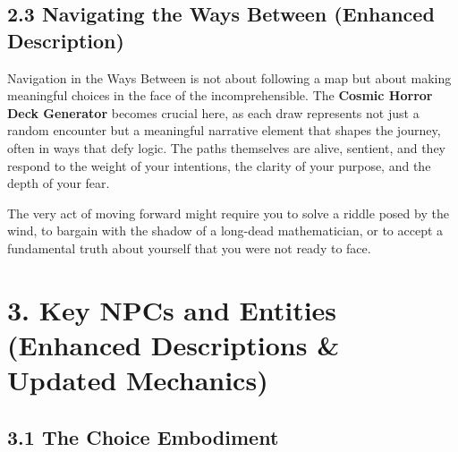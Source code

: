 \documentclass[11pt]{article}
\begin{document}
\subsection*{2.3 Navigating the Ways Between (Enhanced Description)}

Navigation in the Ways Between is not about following a map but about making meaningful choices in the face of the incomprehensible. The \textbf{Cosmic Horror Deck Generator} becomes crucial here, as each draw represents not just a random encounter but a meaningful narrative element that shapes the journey, often in ways that defy logic. The paths themselves are alive, sentient, and they respond to the weight of your intentions, the clarity of your purpose, and the depth of your fear.

The very act of moving forward might require you to solve a riddle posed by the wind, to bargain with the shadow of a long-dead mathematician, or to accept a fundamental truth about yourself that you were not ready to face.

\clearpage

\section*{3. Key NPCs and Entities (Enhanced Descriptions \& Updated Mechanics)}

\subsection*{3.1 The Choice Embodiment}
\end{document}

